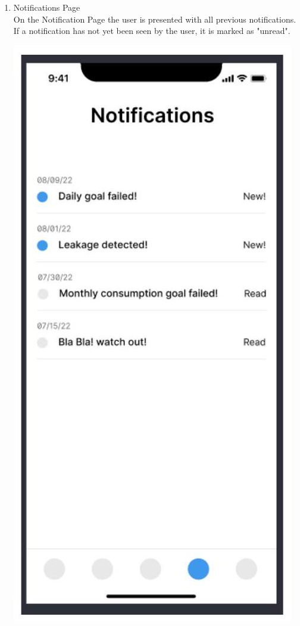 \documentclass[10pt]{article}
\begin{document}
\begin{enumerate}
  \item {Notifications Page} \\
  On the Notification Page the user is presented with all previous notifications. If a notification has not yet been seen by the user, it is marked as "unread".

  \includegraphics[max width=\textwidth]{2022_11_16_e80008f3d60227bff292g-7(1)}


\end{enumerate}
\end{document}
